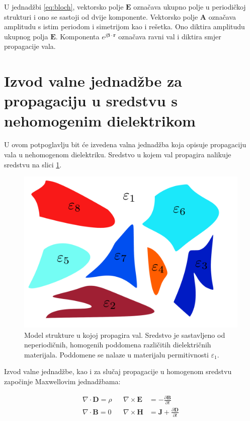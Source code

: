 \documentclass[utf8, seminar, numeric]{fer}
\begin{document}
U jednadžbi \ref{eq:bloch}, vektorsko polje $\mathbf{E}$ označava ukupno polje
u periodičkoj strukturi i ono se sastoji od dvije komponente. Vektorsko polje
$\mathbf{A}$ označava amplitudu s istim periodom i simetrijom kao i rešetka.
Ono diktira amplitudu ukupnog polja $\mathbf{E}$. Komponenta
${e^{j {\bm{\beta}} \cdot \mathbf{r}}}$ označava ravni val i diktira smjer
propagacije vala.




\section{Izvod valne jednadžbe za propagaciju u sredstvu s nehomogenim dielektrikom}

U ovom potpoglavlju bit će izvedena valna jednadžba koja opisuje propagaciju
vala u nehomogenom dielektriku. Sredstvo u kojem val propagira nalikuje sredstvu
na slici \ref{fig:structure}.

\begin{figure}[ht]
	\centering
	\includegraphics[width = 0.8\linewidth]{./images/pdf/structure-model.pdf}
	\caption{Model strukture u kojoj propagira val. Sredstvo je sastavljeno od
	neperiodičnih, homogenih poddomena različitih dielektričnih materijala.
	Poddomene se nalaze u materijalu permitivnosti $\varepsilon_1$.}
	\label{fig:structure}
\end{figure}

\FloatBarrier

Izvod valne jednadžbe, kao i za slučaj propagacije u homogenom sredstvu započinje
Maxwellovim jednadžbama:

\begin{align} \label{eq:maxwell1}
	\nabla \cdot \mathbf{D} = \rho &&
	\nabla \times \mathbf{E} &=
		- \frac{\partial \mathbf{B}}{\partial t}  \nonumber \\
	\nabla \cdot \mathbf{B} = 0 &&
	\nabla \times \mathbf{H} &=
		\mathbf{J} + \frac{\partial \mathbf{D}}{\partial t}
\end{align}
\end{document}
